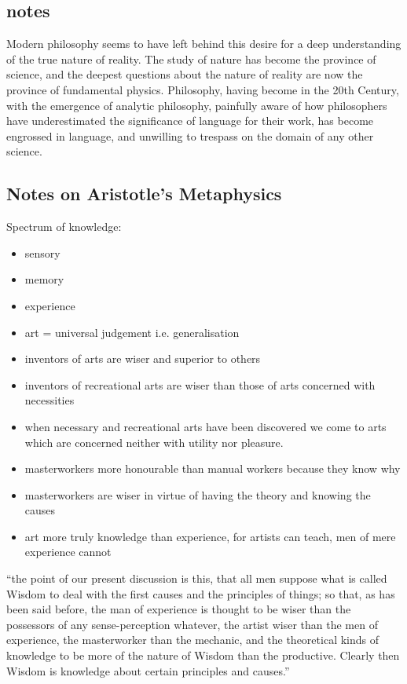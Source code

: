 \documentclass{rbjk}
\begin{document}
\begin{article}
\subsection{notes}

Modern philosophy seems to have left behind this desire for a deep understanding of the true nature of reality.
The study of nature has become the province of science, and the deepest questions about the nature of reality are now the province of fundamental physics.
Philosophy, having become in the 20th Century, with the emergence of analytic philosophy, painfully aware of how philosophers have underestimated the significance of language for their work, has become engrossed in language, and unwilling to trespass on the domain of any other science.

\subsection{Notes on Aristotle's Metaphysics}

Spectrum of knowledge:
\begin{itemize}
\item sensory
\item memory
\item experience
\item art = universal judgement i.e. generalisation
\item inventors of arts are wiser and superior to others
\item inventors of recreational arts are wiser than those of arts concerned with necessities
\item when necessary and recreational arts have been discovered we come to arts which are concerned neither with utility nor pleasure.
\end{itemize}

\begin{itemize}
\item masterworkers more honourable than manual workers because they know why
\item masterworkers are wiser in virtue of having the theory and knowing the causes
\item art more truly knowledge than experience, for artists can teach, men of mere experience cannot
\end{itemize}

``the point of our present discussion is this, that all men suppose what is called Wisdom to deal with the first causes and the principles of things; so that, as has been said before, the man of experience is thought to be wiser than the possessors of any sense-perception whatever, the artist wiser than the men of experience, the masterworker than the mechanic, and the theoretical kinds of knowledge to be more of the nature of Wisdom than the productive. Clearly then Wisdom is knowledge about certain principles and causes.''


\end{article}
\end{document}
